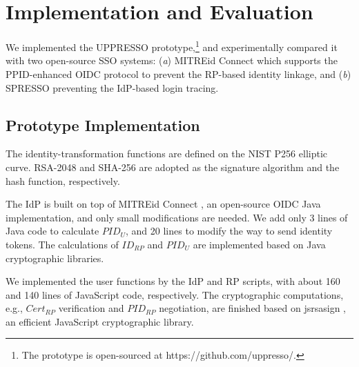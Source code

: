 \section{Implementation and Evaluation}
\label{sec:implementation}
We implemented the UPPRESSO prototype,\footnote{The prototype is open-sourced at https://github.com/uppresso/.}
 and experimentally compared it
 with two open-source SSO systems:
  (\emph{a}) MITREid Connect \cite{MITREid}
    which supports the PPID-enhanced OIDC protocol to prevent the RP-based identity linkage,
     and (\emph{b}) SPRESSO \cite{SPRESSO} preventing the IdP-based login tracing.


\subsection{Prototype Implementation}
\label{subsec:proto-imple}
The identity-transformation functions are defined on
        the NIST P256 elliptic curve.
RSA-2048 and SHA-256 are adopted as the signature algorithm and the hash function, respectively.

The IdP is built on top of MITREid Connect \cite{MITREid},
    an open-source OIDC Java implementation, %
    and only small modifications are needed.
We add only 3 lines of Java code to calculate $PID_U$,
    and 20 lines to modify the way to send identity tokens.
The calculations of $ID_{RP}$ and $PID_U$ are implemented based on Java cryptographic libraries.

We implemented the user functions by the IdP and RP scripts,
     with about 160 and 140 lines of JavaScript code, respectively.
The cryptographic computations, e.g., $Cert_{RP}$ verification and $PID_{RP}$ negotiation, are finished based on jsrsasign \cite{jsrsasign}, an efficient JavaScript cryptographic library.

